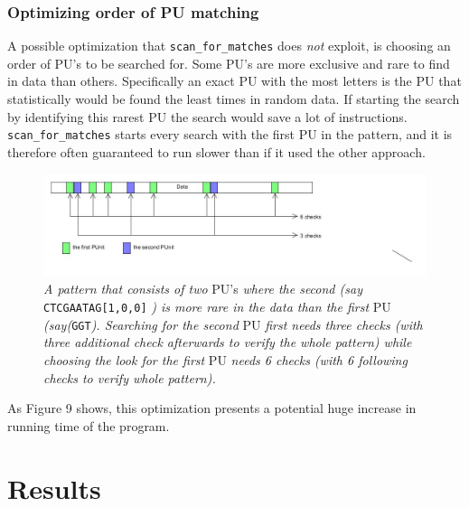 \documentclass[12pt]{article}
\newcommand{\scm}{\texttt{scan\_for\_matches} }
\newcommand{\pu}{PU }
\newcommand{\pus}{PU's }
\begin{document}
\subsubsection{Optimizing order of \pu matching}
A possible optimization that \scm does \textit{not} exploit, is choosing an order of \pus to be searched for.
Some \pus are more exclusive and rare to find in data than others. Specifically an exact \pu with the most
letters is the \pu that statistically would be found the least times in random data. If starting the search by
identifying this rarest \pu the search would save a lot of instructions. \scm starts every search with the 
first \pu in the pattern, and it is therefore often guaranteed to run slower than if it used the other approach.
\begin{figure}[H]
\begin{center}
\includegraphics[scale=0.65]{opti1.jpg}
\end{center}
\caption{\textit{A pattern that consists of two} \pus \textit{where the second (say} \texttt{CTCGAATAG[1,0,0]}
\textit{) is more rare in the data than the first} \pu \textit{(say(}\texttt{GGT}\textit{). Searching for the 
second} \pu \textit{first needs three checks (with three additional check afterwards to verify the whole pattern)
while choosing the look for the first} \pu \textit{needs 6 checks (with 6 following checks to verify whole pattern).}}
\end{figure}
\noindent As Figure 9 shows, this optimization presents a potential huge increase in running time of the program. \newpage
\section{Results}

\printbibliography
\end{document}
